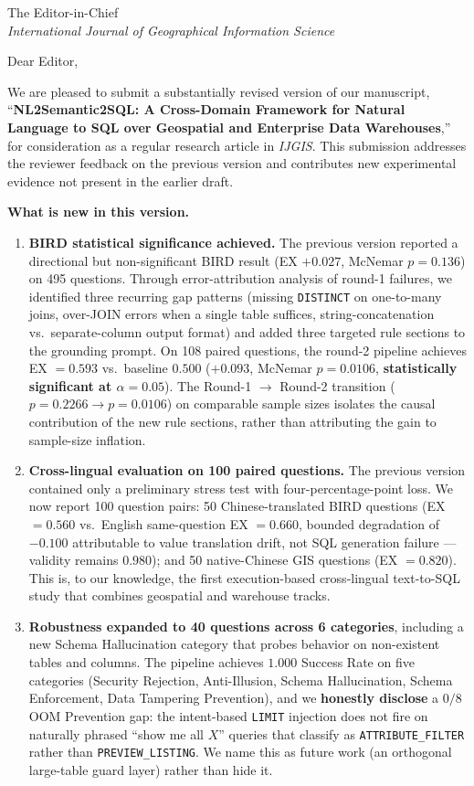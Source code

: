 \documentclass[11pt]{letter}
\begin{document}
\begin{letter}{The Editor-in-Chief \\ \emph{International Journal of Geographical Information Science}}

\opening{Dear Editor,}

We are pleased to submit a substantially revised version of our manuscript, ``\textbf{NL2Semantic2SQL: A Cross-Domain Framework for Natural Language to SQL over Geospatial and Enterprise Data Warehouses},'' for consideration as a regular research article in \emph{IJGIS}. This submission addresses the reviewer feedback on the previous version and contributes new experimental evidence not present in the earlier draft.

\medskip
\noindent\textbf{What is new in this version.}

\begin{enumerate}
\item \textbf{BIRD statistical significance achieved.} The previous version reported a directional but non-significant BIRD result (EX $+0.027$, McNemar $p=0.136$) on 495 questions. Through error-attribution analysis of round-1 failures, we identified three recurring gap patterns (missing \texttt{DISTINCT} on one-to-many joins, over-JOIN errors when a single table suffices, string-concatenation vs.\ separate-column output format) and added three targeted rule sections to the grounding prompt. On 108 paired questions, the round-2 pipeline achieves EX $=0.593$ vs.\ baseline $0.500$ ($+0.093$, McNemar $p=0.0106$, \textbf{statistically significant at $\alpha=0.05$}). The Round-1 $\to$ Round-2 transition ($p=0.2266 \to p=0.0106$) on comparable sample sizes isolates the causal contribution of the new rule sections, rather than attributing the gain to sample-size inflation.

\item \textbf{Cross-lingual evaluation on 100 paired questions.} The previous version contained only a preliminary stress test with four-percentage-point loss. We now report 100 question pairs: 50 Chinese-translated BIRD questions (EX $=0.560$ vs.\ English same-question EX $=0.660$, bounded degradation of $-0.100$ attributable to value translation drift, not SQL generation failure --- validity remains $0.980$); and 50 native-Chinese GIS questions (EX $=0.820$). This is, to our knowledge, the first execution-based cross-lingual text-to-SQL study that combines geospatial and warehouse tracks.

\item \textbf{Robustness expanded to 40 questions across 6 categories}, including a new Schema Hallucination category that probes behavior on non-existent tables and columns. The pipeline achieves $1.000$ Success Rate on five categories (Security Rejection, Anti-Illusion, Schema Hallucination, Schema Enforcement, Data Tampering Prevention), and we \textbf{honestly disclose} a $0/8$ OOM Prevention gap: the intent-based \texttt{LIMIT} injection does not fire on naturally phrased ``show me all $X$'' queries that classify as \texttt{ATTRIBUTE\_FILTER} rather than \texttt{PREVIEW\_LISTING}. We name this as future work (an orthogonal large-table guard layer) rather than hide it.


\end{enumerate}
\end{letter}
\end{document}
